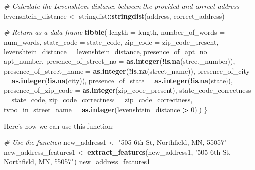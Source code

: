 \documentclass[
]{book}
\newenvironment{Shaded}{\begin{snugshade}}{\end{snugshade}}
\newcommand{\AttributeTok}[1]{\textcolor[rgb]{0.13,0.29,0.53}{#1}}
\newcommand{\CommentTok}[1]{\textcolor[rgb]{0.56,0.35,0.01}{\textit{#1}}}
\newcommand{\DecValTok}[1]{\textcolor[rgb]{0.00,0.00,0.81}{#1}}
\newcommand{\FunctionTok}[1]{\textcolor[rgb]{0.13,0.29,0.53}{\textbf{#1}}}
\newcommand{\NormalTok}[1]{#1}
\newcommand{\OtherTok}[1]{\textcolor[rgb]{0.56,0.35,0.01}{#1}}
\newcommand{\SpecialCharTok}[1]{\textcolor[rgb]{0.81,0.36,0.00}{\textbf{#1}}}
\newcommand{\StringTok}[1]{\textcolor[rgb]{0.31,0.60,0.02}{#1}}
\begin{document}
\begin{Shaded}
\begin{Highlighting}[]
  \CommentTok{\# Calculate the Levenshtein distance between the provided and correct address}
\NormalTok{  levenshtein\_distance }\OtherTok{\textless{}{-}}\NormalTok{ stringdist}\SpecialCharTok{::}\FunctionTok{stringdist}\NormalTok{(address, correct\_address)}

  \CommentTok{\# Return as a data frame}
  \FunctionTok{tibble}\NormalTok{(}
    \AttributeTok{length =}\NormalTok{ length,}
    \AttributeTok{number\_of\_words =}\NormalTok{ num\_words,}
    \AttributeTok{state\_code =}\NormalTok{ state\_code,}
    \AttributeTok{zip\_code =}\NormalTok{ zip\_code\_present,}
    \AttributeTok{levenshtein\_distance =}\NormalTok{ levenshtein\_distance,}
    \AttributeTok{presence\_of\_apt\_no =}\NormalTok{ apt\_number,}
    \AttributeTok{presence\_of\_street\_no =} \FunctionTok{as.integer}\NormalTok{(}\SpecialCharTok{!}\FunctionTok{is.na}\NormalTok{(street\_number)),}
    \AttributeTok{presence\_of\_street\_name =} \FunctionTok{as.integer}\NormalTok{(}\SpecialCharTok{!}\FunctionTok{is.na}\NormalTok{(street\_name)),}
    \AttributeTok{presence\_of\_city =} \FunctionTok{as.integer}\NormalTok{(}\SpecialCharTok{!}\FunctionTok{is.na}\NormalTok{(city)),}
    \AttributeTok{presence\_of\_state =} \FunctionTok{as.integer}\NormalTok{(}\SpecialCharTok{!}\FunctionTok{is.na}\NormalTok{(state)),}
    \AttributeTok{presence\_of\_zip\_code =} \FunctionTok{as.integer}\NormalTok{(zip\_code\_present),}
    \AttributeTok{state\_code\_correctness =}\NormalTok{ state\_code,}
    \AttributeTok{zip\_code\_correctness =}\NormalTok{ zip\_code\_correctness,}
    \AttributeTok{typo\_in\_street\_name =} \FunctionTok{as.integer}\NormalTok{(levenshtein\_distance }\SpecialCharTok{\textgreater{}} \DecValTok{0}\NormalTok{)}
\NormalTok{  )}
\NormalTok{\}}
\end{Highlighting}
\end{Shaded}

Here's how we can use this function:

\begin{Shaded}
\begin{Highlighting}[]
\CommentTok{\# Use the function}
\NormalTok{new\_address1 }\OtherTok{\textless{}{-}} \StringTok{"505 6th St,  Northfield, MN, 55057"}
\NormalTok{new\_address\_features1 }\OtherTok{\textless{}{-}} \FunctionTok{extract\_features}\NormalTok{(new\_address1, }\StringTok{"505 6th St,  Northfield, MN, 55057"}\NormalTok{)}
\NormalTok{new\_address\_features1}
\end{Highlighting}
\end{Shaded}
\end{document}
